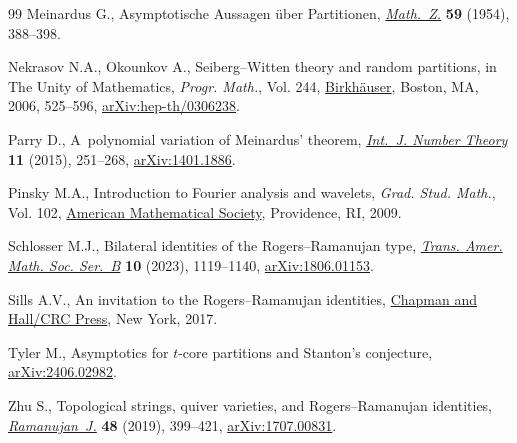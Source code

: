 \documentclass[pdftex]{sigma}
\numberwithin{equation}{section}
\begin{document}
\begin{thebibliography}{99}
Meinardus G., Asymptotische {A}ussagen \"uber {P}artitionen, \href{https://doi.org/10.1007/BF01180268}{\textit{Math.~Z.}}
 \textbf{59} (1954), 388--398.

Nekrasov N.A., Okounkov A., Seiberg--{W}itten theory and random partitions, in
 The Unity of Mathematics, \textit{Progr. Math.}, Vol. 244, \href{https://doi.org/10.1007/0-8176-4467-9_15}{Birkh\"auser},
 Boston, MA, 2006, 525--596, \href{https://arxiv.org/abs/hep-th/0306238}{arXiv:hep-th/0306238}.

Parry D., A~polynomial variation of {M}einardus' theorem, \href{https://doi.org/10.1142/S1793042115500153}{\textit{Int.~J.
 Number Theory}} \textbf{11} (2015), 251--268, \href{https://arxiv.org/abs/1401.1886}{arXiv:1401.1886}.

Pinsky M.A., Introduction to {F}ourier analysis and wavelets, \textit{Grad.
 Stud. Math.}, Vol. 102, \href{https://doi.org/10.1090/gsm/102}{American Mathematical Society}, Providence, RI, 2009.

Schlosser M.J., Bilateral identities of the {R}ogers--{R}amanujan type,
 \href{https://doi.org/10.1090/btran/158}{\textit{Trans. Amer. Math. Soc. Ser.~B}} \textbf{10} (2023), 1119--1140,
 \href{https://arxiv.org/abs/1806.01153}{arXiv:1806.01153}.

Sills A.V., An invitation to the {R}ogers--{R}amanujan identities, \href{https://doi.org/10.1201/9781315151922}{Chapman and
 Hall/CRC Press}, New York, 2017.

Tyler M., Asymptotics for $t$-core partitions and {S}tanton's conjecture,
 \href{https://arxiv.org/abs/2406.02982}{arXiv:2406.02982}.

Zhu S., Topological strings, quiver varieties, and {R}ogers--{R}amanujan
 identities, \href{https://doi.org/10.1007/s11139-017-9976-4}{\textit{Ramanujan~J.}} \textbf{48} (2019), 399--421,
 \href{https://arxiv.org/abs/1707.00831}{arXiv:1707.00831}.

\end{thebibliography}\LastPageEnding
\end{document}
